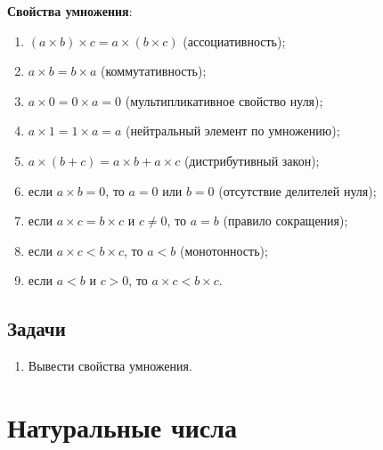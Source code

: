 \textbf{Свойства умножения}:
\begin{enumerate}[label=P\arabic*]
\item $(a\times b)\times c = a\times (b\times c)$ (ассоциативность);
\item $a\times b=b\times a$ (коммутативность);
\item $a\times 0=0\times a=0$ (мультипликативное свойство нуля);
\item $a\times 1=1\times a=a$ (нейтральный элемент по умножению);
\item $a\times(b+c)=a\times b+a\times c$ (дистрибутивный закон);
\item если $a\times b=0$, то $a=0$ или $b=0$ (отсутствие делителей нуля);
\item если $a\times c=b\times c$ и $c\ne 0$, то $a=b$ (правило сокращения);
\item если $a\times c<b\times c$, то $a<b$ (монотонность);
\item если $a<b$ и $c>0$, то $a\times c<b\times c$.
\end{enumerate}


\subsection{Задачи}
\begin{enumerate}
\item Вывести свойства умножения.
\end{enumerate}

\section{Натуральные числа}

